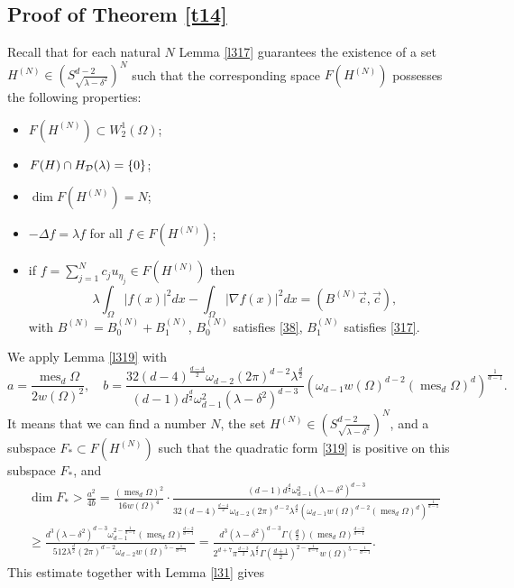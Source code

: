 \documentclass[a4paper,12pt]{article}
\numberwithin{equation}{section}
\def \de{\delta}
\def \la{\lambda}
\def \oo{\omega}
\def \G{\Gamma}
\def \D{\Delta}
\def \O{\Omega}
\def\n{\nabla}
\def\mes{\operatorname{mes}}
\newcommand{\<}{\langle}
\renewcommand{\>}{\rangle}
\theoremstyle{plain}
\theoremstyle{definition}
\theoremstyle{remark}
\renewcommand{\ge}{\geqslant}
\begin{document}
\subsection{Proof of Theorem \ref{t14}}
Recall that for each natural $N$ Lemma \ref{l317} guarantees the existence of a set 
$H^{(N)} \in \left(S_{\sqrt{\la-\de^2}}^{d-2}\right)^N$
such that the corresponding space $F(H^{(N)})$ possesses the following properties:
\begin{itemize}
\item $F(H^{(N)}) \subset W_2^1 (\O)$;
\item $F (H) \cap H_{\cal D} (\la) = \{0\}$;
\item $\dim F(H^{(N)}) = N$;
\item $- \D f = \la f$ for all $f \in F(H^{(N)})$;
\item if 
$f = \sum_{j=1}^N c_j u_{\eta_j} \in F(H^{(N)})$ then
\begin{equation}
\label{319}
\la \int_\O |f(x)|^2 dx - \int_\O |\n f(x)|^2 dx = (B^{(N)} \vec c, \vec c),
\end{equation}
with $B^{(N)} = B_0^{(N)} + B_1^{(N)}$, 
$B_0^{(N)}$ satisfies \eqref{38},
$B_1^{(N)}$ satisfies \eqref{317}.
\end{itemize}
We apply Lemma \ref{l319} with
$$
a = \frac{\mes_d \O}{2 w(\O)^2}, \quad
b = \frac{32 (d-4)^{\frac{d-4}2} \oo_{d-2} (2\pi)^{d-2} \la^{\frac{d}2}}
{(d-1) d^{\frac{d}2} \oo_{d-1}^2 (\la-\de^2)^{d-3}}  
\left(\oo_{d-1} w(\O)^{d-2} \left(\mes_d\O\right)^d\right)^{\frac1{d-1}} .
$$
It means that we can find a number $N$, the set 
$H^{(N)} \in \left(S_{\sqrt{\la-\de^2}}^{d-2}\right)^N$,
and a subspace $F_* \subset F(H^{(N)})$ such that
the quadratic form \eqref{319} is positive on this subspace $F_*$, and
\begin{eqnarray*}
\dim F_* > \frac{a^2}{4b} 
= \frac{(\mes_d \O)^2}{16 w(\O)^4} \cdot
\frac{(d-1) d^{\frac{d}2} \oo_{d-1}^2 (\la-\de^2)^{d-3}}
{32 (d-4)^{\frac{d-4}2} \oo_{d-2} (2\pi)^{d-2} \la^{\frac{d}2}
\left(\oo_{d-1} w(\O)^{d-2} \left(\mes_d\O\right)^d\right)^{\frac1{d-1}}} \\
\ge \frac{d^3 (\la-\de^2)^{d-3} \oo_{d-1}^{2 - \frac1{d-1}} (\mes_d \O)^{\frac{d-2}{d-1}}}
{512 \la^{\frac{d}2} (2\pi)^{d-2} \oo_{d-2} w(\O)^{5 - \frac1{d-1}}}
= \frac{d^3 (\la-\de^2)^{d-3} \G\left(\frac{d}2\right) (\mes_d \O)^{\frac{d-2}{d-1}}}
{2^{d+7} \pi^{\frac{d-3}2} \la^{\frac{d}2} 
\G \left(\frac{d+1}2\right)^{2 - \frac1{d-1}} w(\O)^{5 - \frac1{d-1}}}.
\end{eqnarray*}
This estimate together with Lemma \ref{l31} gives
\end{document}

